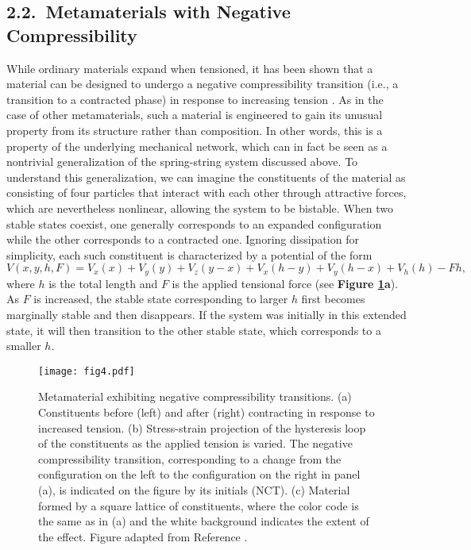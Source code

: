 \documentclass[
preprint,
superscriptaddress,
aps,
prl,
]{revtex4-1}
\begin{document}
\subsection{2.2.~Metamaterials with Negative Compressibility}

While ordinary materials expand when tensioned, it has been shown that a material can be designed to undergo a negative compressibility transition (i.e., a transition to a contracted phase) in response to increasing tension \cite{nicolaou2012mechanical}. As in the case of other  metamaterials, such a  material is engineered to gain its unusual property from its structure rather than  composition. 
{\color{black} In other words,}
this is a property of the underlying mechanical network, 
which can in fact be seen as a nontrivial generalization of the spring-string system discussed above.  To understand this generalization, we can imagine the constituents of the material as consisting of four particles that interact with each other through attractive forces, which are nevertheless nonlinear, allowing the system to be bistable.
{\color{black}  When two stable states coexist, one generally corresponds to an expanded configuration while the other corresponds to a contracted one.}
Ignoring dissipation for simplicity, each such constituent is characterized by a potential of the form 
\begin{equation}
V(x,y,h,F)=V_x(x)+V_y(y)+V_z(y-x)+V_x(h-y)+V_y(h-x)+V_h(h)-Fh,
\label{eq2}
\end{equation}
where $h$ is the total length and $F$ is the applied tensional force (see \textbf{Figure \ref{fig4}a}). As $F$ is increased, the stable state corresponding to larger $h$  first becomes marginally stable and then disappears. If the system was initially in this extended state, it will then transition to the other stable state, which corresponds to a smaller $h$. 

\begin{figure}[h]
\texttt{[image: fig4.pdf]}
\caption{Metamaterial exhibiting  negative compressibility transitions.
(a) Constituents before (left) and after (right) contracting in response to increased tension. 
(b) Stress-strain projection of the hysteresis loop {\color{black} of the constituents} as the applied tension is varied. 
{\color{black} The}
negative compressibility transition, 
{\color{black} corresponding to a change from the configuration  on the left to the configuration on the right in panel (a),} is indicated 
on the figure by its initials (NCT).
(c) Material formed by a square lattice of constituents, where the color code is the same as in (a) 
and the white background indicates the extent of the effect.
Figure adapted from  Reference \cite{nicolaou2012mechanical}.
}
\label{fig4}
\end{figure}
\end{document}
